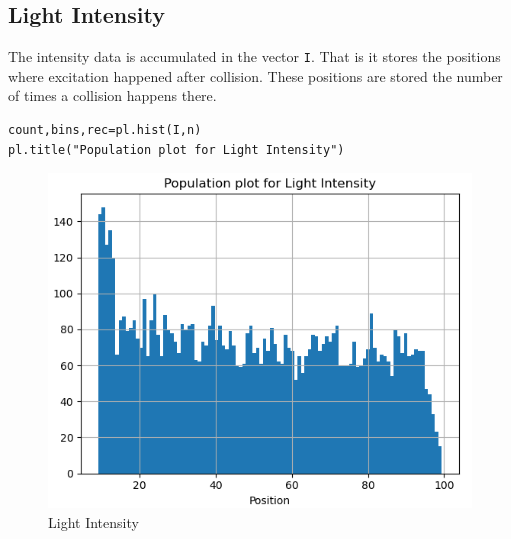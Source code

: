 \documentclass[11pt, a4paper]{article}
\begin{document}
\subsection{Light Intensity}
    The intensity data is accumulated in the vector \texttt{I}. That is it stores the positions where excitation happened after collision. These positions are stored the number of times a collision happens there.
    \begin{verbatim}
count,bins,rec=pl.hist(I,n)
pl.title("Population plot for Light Intensity")
    \end{verbatim}
    \begin{figure}[!h]
        \centering
        \includegraphics[scale = 0.67]{Figure 2.png}
        \caption{Light Intensity}
        \label{fig:my_label}
    \end{figure}
\end{document}
